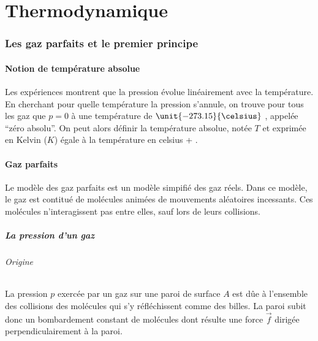 \part{Thermodynamique}

\section{Les gaz parfaits et le premier principe}

\subsection{Notion de température absolue}
Les expériences montrent que la pression évolue linéairement avec la température.
En cherchant pour quelle température la pression s'annule, on trouve
pour tous les gaz que $p = 0$ à une température de $\unit{-273.15}{\celsius}$
, appelée ``zéro absolu''. On peut alors définir la température absolue, notée
$T$ et exprimée en Kelvin ($K$) égale à la température en celsius + .

\subsection{Gaz parfaits}
Le modèle des gaz parfaits est un modèle simpifié des gaz réels.
Dans ce modèle, le gaz est contitué de molécules animées de mouvements
aléatoires incessants. Ces molécules n'interagissent pas entre elles, 
sauf lors de leurs collisions.

\subsubsection{La pression d'un gaz}

\paragraph{Origine}
La pression $p$ exercée par un gaz sur une paroi de surface $A$ 
est dûe à l'ensemble des collisions des molécules qui s'y réfléchissent
comme des billes. La paroi subit donc un bombardement constant de
molécules dont résulte une force $\vec{f}$ dirigée perpendiculairement
à la paroi.

